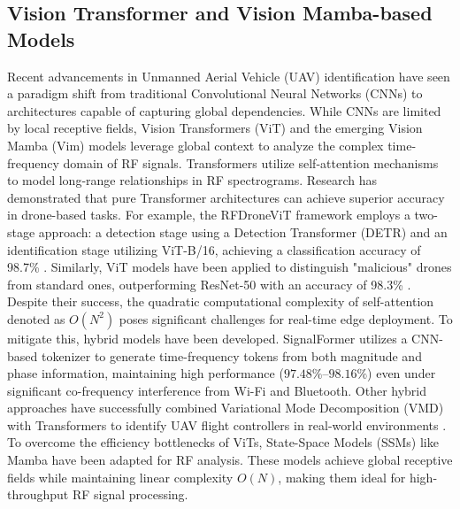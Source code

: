 \documentclass[runningheads]{llncs}
\begin{document}
\subsection{Vision Transformer and Vision Mamba-based Models}
Recent advancements in Unmanned Aerial Vehicle (UAV) identification have seen a paradigm shift from traditional Convolutional Neural Networks (CNNs) to architectures capable of capturing global dependencies. While CNNs are limited by local receptive fields, Vision Transformers (ViT) and the emerging Vision Mamba (Vim) models leverage global context to analyze the complex time-frequency domain of RF signals.
Transformers utilize self-attention mechanisms to model long-range relationships in RF spectrograms. Research has demonstrated that pure Transformer architectures can achieve superior accuracy in drone-based tasks. For example, the RFDroneViT framework employs a two-stage approach: a detection stage using a Detection Transformer (DETR) and an identification stage utilizing ViT-B/16, achieving a classification accuracy of 98.7\% \cite{xu2025rfv}. Similarly, ViT models have been applied to distinguish "malicious" drones from standard ones, outperforming ResNet-50 with an accuracy of 98.3\% \cite{jamil2022malicious}.
Despite their success, the quadratic computational complexity of self-attention denoted as $O(N^2)$ poses significant challenges for real-time edge deployment. To mitigate this, hybrid models have been developed. SignalFormer \cite{yan2023signalformer} utilizes a CNN-based tokenizer to generate time-frequency tokens from both magnitude and phase information, maintaining high performance ($97.48\%$–$98.16\%$) even under significant co-frequency interference from Wi-Fi and Bluetooth. Other hybrid approaches have successfully combined Variational Mode Decomposition (VMD) with Transformers to identify UAV flight controllers in real-world environments \cite{han2025realworld}.
To overcome the efficiency bottlenecks of ViTs, State-Space Models (SSMs) like Mamba \cite{ref27} have been adapted for RF analysis. These models achieve global receptive fields while maintaining linear complexity $O(N)$, making them ideal for high-throughput RF signal processing. 
\end{document}
